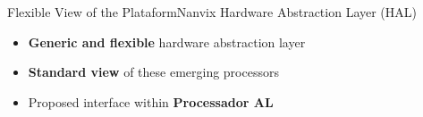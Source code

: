 		\begin{frame}[fragile]{Flexible View of the Plataform}{Nanvix Hardware Abstraction Layer (HAL)}

			\begin{itemize}
				\item \textbf{Generic and flexible} hardware abstraction layer
				\item \textbf{Standard view} of these emerging processors
				\item Proposed interface within \textbf{Processador AL}
			\end{itemize}


		\end{frame}


